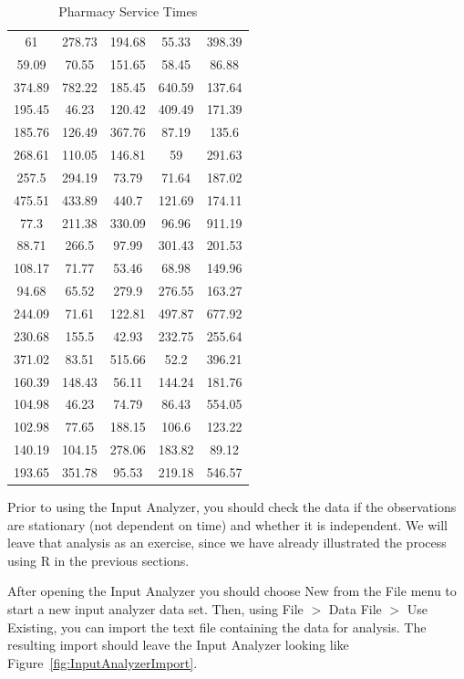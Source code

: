 \documentclass[
]{book}
\theoremstyle{definition}
\theoremstyle{definition}
\theoremstyle{definition}
\theoremstyle{definition}
\theoremstyle{remark}
\begin{document}
\hypertarget{tab:PharmacyData}{}
\begin{longtable}[]{@{}ccccc@{}}
\caption{\label{tab:PharmacyData} Pharmacy Service Times}\tabularnewline
\toprule
\endhead
61 & 278.73 & 194.68 & 55.33 & 398.39 \\
59.09 & 70.55 & 151.65 & 58.45 & 86.88 \\
374.89 & 782.22 & 185.45 & 640.59 & 137.64 \\
195.45 & 46.23 & 120.42 & 409.49 & 171.39 \\
185.76 & 126.49 & 367.76 & 87.19 & 135.6 \\
268.61 & 110.05 & 146.81 & 59 & 291.63 \\
257.5 & 294.19 & 73.79 & 71.64 & 187.02 \\
475.51 & 433.89 & 440.7 & 121.69 & 174.11 \\
77.3 & 211.38 & 330.09 & 96.96 & 911.19 \\
88.71 & 266.5 & 97.99 & 301.43 & 201.53 \\
108.17 & 71.77 & 53.46 & 68.98 & 149.96 \\
94.68 & 65.52 & 279.9 & 276.55 & 163.27 \\
244.09 & 71.61 & 122.81 & 497.87 & 677.92 \\
230.68 & 155.5 & 42.93 & 232.75 & 255.64 \\
371.02 & 83.51 & 515.66 & 52.2 & 396.21 \\
160.39 & 148.43 & 56.11 & 144.24 & 181.76 \\
104.98 & 46.23 & 74.79 & 86.43 & 554.05 \\
102.98 & 77.65 & 188.15 & 106.6 & 123.22 \\
140.19 & 104.15 & 278.06 & 183.82 & 89.12 \\
193.65 & 351.78 & 95.53 & 219.18 & 546.57 \\
\bottomrule
\end{longtable}

Prior to using the Input Analyzer, you should check the data if the
observations are stationary (not dependent on time) and whether it is
independent. We will leave that analysis as an exercise, since we have
already illustrated the process using R in the previous sections.

After opening the Input Analyzer you should choose New from the File
menu to start a new input analyzer data set. Then, using File \(>\) Data
File \(>\) Use Existing, you can import the text file containing the data
for analysis. The resulting import should leave the Input Analyzer
looking like Figure~\ref{fig:InputAnalyzerImport}.
\end{document}
